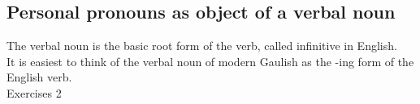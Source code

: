 \subsection{Personal pronouns as object of a verbal noun}

\noindent The verbal noun is the basic root form of the verb, called infinitive in English.\\

\noindent It is easiest to think of the verbal noun of modern Gaulish as the -ing form of the English verb.\\

\noindent Exercises 2

